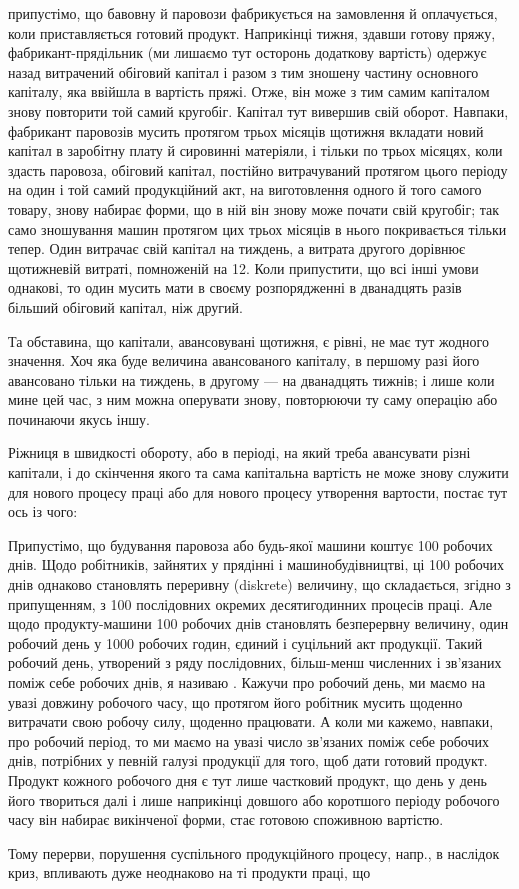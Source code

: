 \parcont{}  %
припустімо, що бавовну й паровози фабрикується на замовлення й оплачується,
коли приставляється готовий продукт. Наприкінці тижня, здавши
готову пряжу, фабрикант-прядільник (ми лишаємо тут осторонь додаткову
вартість) одержує назад витрачений обіговий капітал і разом з тим зношену
частину основного капіталу, яка ввійшла в вартість пряжі. Отже,
він може з тим самим капіталом знову повторити той самий кругобіг.
Капітал тут вивершив свій оборот. Навпаки, фабрикант паровозів мусить
протягом трьох місяців щотижня вкладати новий капітал в заробітну
плату й сировинні матеріяли, і тільки по трьох місяцях, коли здасть паровоза,
обіговий капітал, постійно витрачуваний протягом цього періоду
на один і той самий продукційний акт, на виготовлення одного й того
самого товару, знову набирає форми, що в ній він знову може почати
свій кругобіг; так само зношування машин протягом цих трьох місяців
в нього покривається тільки тепер. Один витрачає свій капітал на тиждень,
а витрата другого дорівнює щотижневій витраті, помноженій на 12.
Коли припустити, що всі інші умови однакові, то один мусить мати в
своєму розпорядженні в дванадцять разів більший обіговий капітал, ніж
другий.

Та обставина, що капітали, авансовувані щотижня, є рівні, не має
тут жодного значення. Хоч яка буде величина авансованого капіталу, в
першому разі його авансовано тільки на тиждень, в другому — на дванадцять
тижнів; і лише коли мине цей час, з ним можна оперувати
знову, повторюючи ту саму операцію або починаючи якусь іншу.

Ріжниця в швидкості обороту, або в періоді, на який треба авансувати
різні капітали, і до скінчення якого та сама капітальна вартість не
може знову служити для нового процесу праці або для нового процесу
утворення вартости, постає тут ось із чого:

Припустімо, що будування паровоза або будь-якої машини коштує
100 робочих днів. Щодо робітників, зайнятих у прядінні і машинобудівництві,
ці 100 робочих днів однаково становлять переривну (diskrete) величину,
що складається, згідно з припущенням, з 100 послідовних окремих
десятигодинних процесів праці. Але щодо продукту-машини 100
робочих днів становлять безперервну величину, один робочий день у
1000 робочих годин, єдиний і суцільний акт продукції. Такий робочий
день, утворений з ряду послідовних, більш-менш численних і зв’язаних
поміж себе робочих днів, я називаю . Кажучи
про робочий день, ми маємо на увазі довжину робочого часу, що протягом
його робітник мусить щоденно витрачати свою робочу силу, щоденно
працювати. А коли ми кажемо, навпаки, про робочий період, то
ми маємо на увазі число зв’язаних поміж себе робочих днів, потрібних
у певній галузі продукції для того, щоб дати готовий продукт. Продукт
кожного робочого дня є тут лише частковий продукт, що день у день
його твориться далі і лише наприкінці довшого або коротшого періоду робочого
часу він набирає викінченої форми, стає готовою споживною вартістю.

Тому перерви, порушення суспільного продукційного процесу, напр.,
в наслідок криз, впливають дуже неоднаково на ті продукти праці, що
\parbreak{}  %
